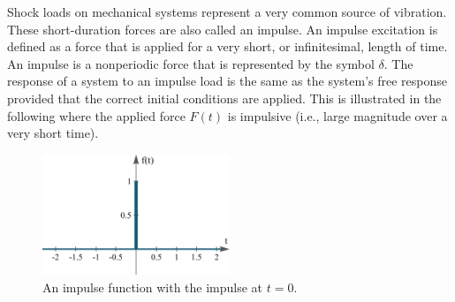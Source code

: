 \documentclass[12pt,letter]{article}
\begin{document}
Shock loads on mechanical systems represent a very common source of vibration. These short-duration forces are also called an impulse. An impulse excitation is defined as a force that is applied for a very short, or infinitesimal, length of time. An impulse is a nonperiodic force that is represented by the symbol $\delta$. The response of a system to an impulse load is the same as the system's free response provided that the correct initial conditions are applied. This is illustrated in the following where the applied force $F(t)$ is impulsive (i.e., large magnitude over a very short time).

\begin{figure}[H]
	\centering
	\includegraphics[width=0.5\textwidth]{../figures/unit_impulse.png}
	\caption{An impulse function with the impulse at $t=0$. }
\end{figure}
\end{document}
